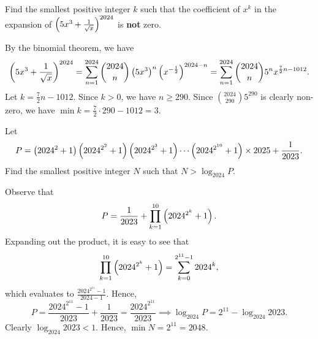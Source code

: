 \begin{question}[3]\label{Q::2024-S-1-9}
    Find the smallest positive integer $k$ such that the coefficient of $x^k$ in the expansion of $\left( 5x^3 + \frac1{\sqrt{x}} \right)^{2024}$ is \textbf{not} zero.
\end{question}
\begin{solution*}
    By the binomial theorem, we have \[\left( 5x^3 + \frac1{\sqrt{x}} \right)^{2024} = \sum_{n = 1}^{2024} \binom{2024}{n} \left( 5x^3 \right)^n \left( x^{-\frac12} \right)^{2024-n} = \sum_{n = 1}^{2024} \binom{2024}{n} 5^n x^{\frac72 n - 1012}.\] Let $k = \frac72 n - 1012$. Since $k > 0$, we have $n \geq 290$. Since $\binom{2024}{290} 5^{290}$ is clearly non-zero, we have $\min k = \frac72 \cdot 290 - 1012 = 3$.
\end{solution*}

\begin{question}[2048]\label{Q::2024-S-1-10}
    Let \[P = \left( 2024^2 + 1 \right)\left( 2024^{2^2} + 1 \right)\left( 2024^{2^3} + 1 \right)\cdots\left( 2024^{2^{10}} + 1 \right) \times 2025 + \dfrac1{2023}.\] Find the smallest positive integer $N$ such that $N > \log_{2024} P$.
\end{question}
\begin{solution*}
    Observe that \[P = \frac1{2023} + \prod_{k = 1}^{10} \left( 2024^{2^k} + 1 \right).\] Expanding out the product, it is easy to see that \[\prod_{k = 1}^{10} \left( 2024^{2^k} + 1 \right) = \sum_{k = 0}^{2^{11} - 1} 2024^k,\] which evaluates to $\frac{2024^{2^{11}} - 1}{2024 - 1}$. Hence, \[P = \frac{2024^{2^{11}} - 1}{2023} + \frac1{2023} = \frac{2024^{2^{11}}}{2023} \implies \log_{2024} P = 2^{11} - \log_{2024} 2023.\] Clearly $\log_{2024} 2023 < 1$. Hence, $\min N = 2^{11} = 2048$.
\end{solution*}

